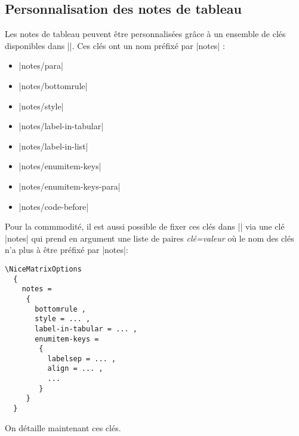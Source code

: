 \documentclass[dvipsnames]{article}%
\begin{document}
\subsection{Personnalisation des notes de tableau}


Les notes de tableau peuvent être personnalisées grâce à un ensemble de clés
disponibles dans |\NiceMatrixOptions|. Ces clés ont un nom préfixé par |notes| :
\begin{itemize}
\item |notes/para| 
\item |notes/bottomrule| 
\item |notes/style| 
\item |notes/label-in-tabular| 
\item |notes/label-in-list| 
\item |notes/enumitem-keys| 
\item |notes/enumitem-keys-para| 
\item |notes/code-before|
\end{itemize}
Pour la commmodité, il est aussi possible de fixer ces clés dans
|\NiceMatrixOptions| via une clé |notes| qui prend en argument une liste de
paires \textsl{clé=valeur} où le nom des clés n'a plus à être préfixé par
|notes|:
\begin{center}
\begin{BVerbatim}[formatcom = \small \color{gray}]
\NiceMatrixOptions
  {
    notes = 
     {
       bottomrule ,
       style = ... ,
       label-in-tabular = ... ,
       enumitem-keys = 
        {
          labelsep = ... ,
          align = ... ,
          ...
        }
     }
  }
\end{BVerbatim}
\end{center}


\bigskip
On détaille maintenant ces clés.
\end{document}
